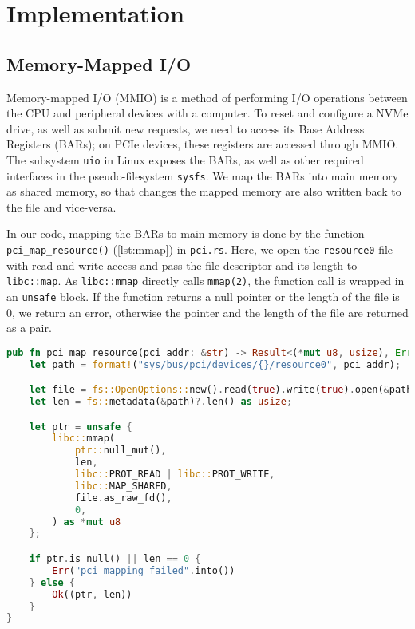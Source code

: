 \chapter{Implementation}\label{chapter:implementation}
\section{Memory-Mapped I/O}\label{section:MMIO}
Memory-mapped I/O (MMIO) is a method of performing I/O operations between the CPU and peripheral devices with a computer. To reset and configure a NVMe drive, as well as submit new requests, we need to access its Base Address Registers (BARs); on PCIe devices, these registers are accessed through MMIO. The subsystem \texttt{uio} in Linux exposes the BARs, as well as other required interfaces in the pseudo-filesystem \texttt{sysfs}. We map the BARs into main memory as shared memory, so that changes the mapped memory are also written back to the file and vice-versa.

In our code, mapping the BARs to main memory is done by the function \texttt{pci\_map\_resource()} (\ref{lst:mmap}) in \texttt{pci.rs}. Here, we open the \texttt{resource0} file with read and write access and pass the file descriptor and its length to \texttt{libc::map}. As \texttt{libc::mmap} directly calls \texttt{mmap(2)}, the function call is wrapped in an \texttt{unsafe} block. If the function returns a null pointer or the length of the file is 0, we return an error, otherwise the pointer and the length of the file are returned as a pair.

\begin{lstlisting}[language=Rust,label=lst:mmap,caption=Memory mapping a PCI resource in Rust]
pub fn pci_map_resource(pci_addr: &str) -> Result<(*mut u8, usize), Error> {
    let path = format!("sys/bus/pci/devices/{}/resource0", pci_addr);

    let file = fs::OpenOptions::new().read(true).write(true).open(&path)?;
    let len = fs::metadata(&path)?.len() as usize;

    let ptr = unsafe {
        libc::mmap(
            ptr::null_mut(),
            len,
            libc::PROT_READ | libc::PROT_WRITE,
            libc::MAP_SHARED,
            file.as_raw_fd(),
            0,
        ) as *mut u8
    };

    if ptr.is_null() || len == 0 {
        Err("pci mapping failed".into())
    } else {
        Ok((ptr, len))
    }
}
\end{lstlisting}

